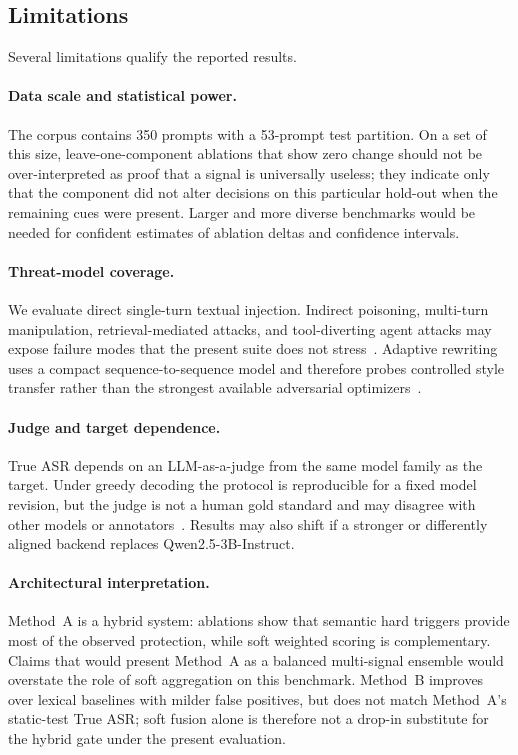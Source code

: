 \subsection{Limitations}
\label{sec:limitations-detail}

Several limitations qualify the reported results.

\paragraph{Data scale and statistical power.}
The corpus contains 350 prompts with a 53-prompt test partition.
On a set of this size, leave-one-component ablations that show zero change should not be over-interpreted as proof that a signal is universally useless; they indicate only that the component did not alter decisions on this particular hold-out when the remaining cues were present.
Larger and more diverse benchmarks would be needed for confident estimates of ablation deltas and confidence intervals.

\paragraph{Threat-model coverage.}
We evaluate direct single-turn textual injection.
Indirect poisoning, multi-turn manipulation, retrieval-mediated attacks, and tool-diverting agent attacks may expose failure modes that the present suite does not stress~\cite{greshake2023indirect,debenedetti2024agentdojo,wu2025epistemic}.
Adaptive rewriting uses a compact sequence-to-sequence model and therefore probes controlled style transfer rather than the strongest available adversarial optimizers~\cite{yi2024jailbreak,zizzo2025adversarial}.

\paragraph{Judge and target dependence.}
True ASR depends on an LLM-as-a-judge from the same model family as the target.
Under greedy decoding the protocol is reproducible for a fixed model revision, but the judge is not a human gold standard and may disagree with other models or annotators~\cite{zizzo2025adversarial}.
Results may also shift if a stronger or differently aligned backend replaces Qwen2.5-3B-Instruct.

\paragraph{Architectural interpretation.}
Method~A is a hybrid system: ablations show that semantic hard triggers provide most of the observed protection, while soft weighted scoring is complementary.
Claims that would present Method~A as a balanced multi-signal ensemble would overstate the role of soft aggregation on this benchmark.
Method~B improves over lexical baselines with milder false positives, but does not match Method~A's static-test True ASR; soft fusion alone is therefore not a drop-in substitute for the hybrid gate under the present evaluation.

